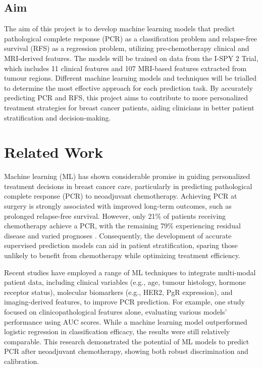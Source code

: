 \documentclass{article}
\begin{document}
\subsection{Aim}

The aim of this project is to develop machine learning models that predict pathological complete response (PCR) as a classification problem and relapse-free survival (RFS) as a regression problem, utilizing pre-chemotherapy clinical and MRI-derived features. The models will be trained on data from the I-SPY 2 Trial\cite{newitt2021acr}, which includes 11 clinical features and 107 MRI-based features extracted from tumour regions. Different machine learning models and techniques will be trialled to determine the most effective approach for each prediction task. By accurately predicting PCR and RFS, this project aims to contribute to more personalized treatment strategies for breast cancer patients, aiding clinicians in better patient stratification and decision-making.

\section{Related Work}

Machine learning (ML) has shown considerable promise in guiding personalized treatment decisions in breast cancer care, particularly in predicting pathological complete response (PCR) to neoadjuvant chemotherapy. Achieving PCR at surgery is strongly associated with improved long-term outcomes, such as prolonged relapse-free survival. However, only 21\% of patients receiving chemotherapy achieve a PCR, with the remaining 79\% experiencing residual disease and varied prognoses \cite{spring2020pathologic}. Consequently, the development of accurate supervised prediction models can aid in patient stratification, sparing those unlikely to benefit from chemotherapy while optimizing treatment efficiency.

Recent studies have employed a range of ML techniques to integrate multi-modal patient data, including clinical variables (e.g., age, tumour histology, hormone receptor status), molecular biomarkers (e.g., HER2, PgR expression), and imaging-derived features, to improve PCR prediction. For example, one study \cite{Zhao2024} focused on clinicopathological features alone, evaluating various models' performance using AUC scores. While a machine learning model outperformed logistic regression in classification efficacy, the results were still relatively comparable. This research demonstrated the potential of ML models to predict PCR after neoadjuvant chemotherapy, showing both robust discrimination and calibration.
\end{document}
